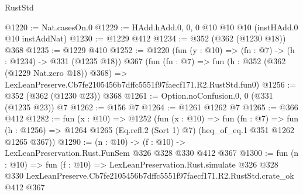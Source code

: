 \begin{lexlean}{RustStd}
\begin{coremodule}
@1220 := Nat.casesOn.{0}
@1229 := HAdd.hAdd.{0, 0, 0} @10 @10 @10 (instHAdd.{0} @10 instAddNat)
@1230 := @1229 @412
@1234 := @352 (@362 (@1230 @18)) @368
@1235 := @1229 @410
@1252 := @1220
    (fun (y : @10) => (fn : @7) -> (h : @1234) -> @331 (@1235 @18))
    @367
    (fun (fn : @7) =>
    fun (h : @352 (@362 (@1229 Nat.zero @18)) @368) =>
    LexLeanPreserve.Cb7fe2105456b7dffc5551f97faecf171.R2.RustStd.fun0)
@1256 := @352 (@362 (@1230 @23)) @368
@1261 := Option.noConfusion.{0, 0} (@331 (@1235 @23)) @7
@1262 := @156 @7
@1264 := @1261 @1262 @7
@1265 := @366 @412
@1282 := fun (x : @10) =>
  @1252
    (fun (x : @10) =>
    fun (fn : @7) =>
    fun (h : @1256) => @1264 @1265 (Eq.refl.{2} (Sort 1) @7) (heq_of_eq.{1} @351 @1262 @1265 @367))
@1290 := (n : @10) -> (f : @10) -> LexLeanPreservation.Rust.FunSem @326 @328 @330 @412 @367
@1300 := fun (n : @10) =>
  fun (f : @10) =>
  LexLeanPreservation.Rust.simulate
    @326
    @328
    @330
    LexLeanPreserve.Cb7fe2105456b7dffc5551f97faecf171.R2.RustStd.crate_ok
    @412
    @367
\end{coremodule}
\end{lexlean}
